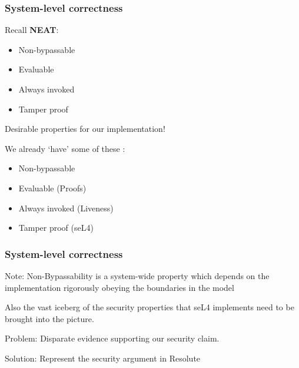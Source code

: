 \documentclass{beamer}
\begin{document}
\begin{frame}\frametitle{System-level correctness}

Recall \textbf{NEAT}:
  \begin{itemize}
   \item Non-bypassable
   \item Evaluable
   \item Always invoked
   \item Tamper proof
 \end{itemize}

  Desirable properties for our implementation!

We already `have' some of these :

  \begin{itemize}
   \item Non-bypassable
   \item Evaluable (Proofs)
   \item Always invoked (Liveness)
   \item Tamper proof (seL4)
 \end{itemize}

\end{frame}

\begin{frame}\frametitle{System-level correctness}

Note: Non-Bypassability is a system-wide property which depends on the
implementation rigorously obeying the boundaries in the model

Also the vast iceberg of the security properties that seL4 implements
need to be brought into the picture.

Problem: Disparate evidence supporting our security claim.

Solution: Represent the security argument in Resolute

\end{frame}
\end{document}
